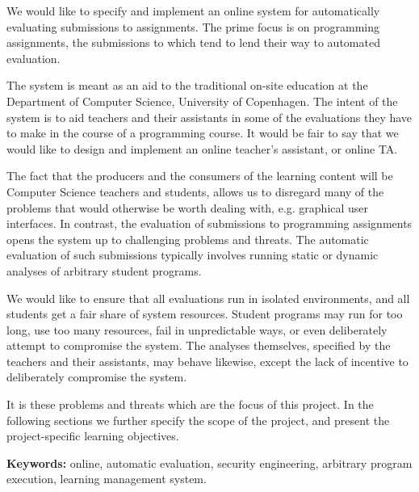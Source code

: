 \documentclass[a4paper]{article}
\begin{document}
\maketitle
\thispagestyle{first} %

We would like to specify and implement an online system for automatically
evaluating submissions to assignments. The prime focus is on programming
assignments, the submissions to which tend to lend their way to automated
evaluation.

The system is meant as an aid to the traditional on-site education at the
Department of Computer Science, University of Copenhagen. The intent of the
system is to aid teachers and their assistants in some of the evaluations they
have to make in the course of a programming course. It would be fair to say
that we would like to design and implement an online teacher's assistant, or
online TA.

The fact that the producers and the consumers of the learning content will be
Computer Science teachers and students, allows us to disregard many of the
problems that would otherwise be worth dealing with, e.g.  graphical user
interfaces. In contrast, the evaluation of submissions to programming
assignments opens the system up to challenging problems and threats. The
automatic evaluation of such submissions typically involves running static or
dynamic analyses of arbitrary student programs.

We would like to ensure that all evaluations run in isolated environments, and
all students get a fair share of system resources. Student programs may run for
too long, use too many resources, fail in unpredictable ways, or even
deliberately attempt to compromise the system. The analyses themselves,
specified by the teachers and their assistants, may behave likewise, except the
lack of incentive to deliberately compromise the system.

It is these problems and threats which are the focus of this project. In the
following sections we further specify the scope of the project, and present the
project-specific learning objectives.

\bigbreak

\textbf{Keywords:} online, automatic evaluation, security engineering,
arbitrary program execution, learning management system.



%

%

%




\end{document}
